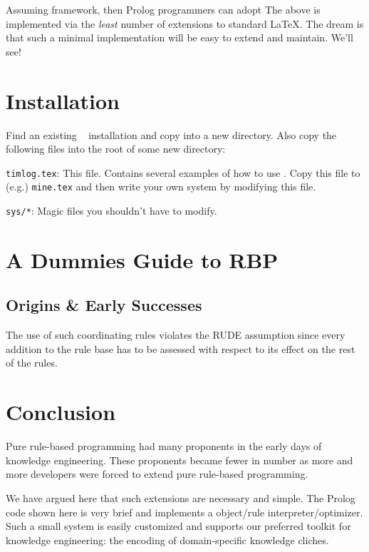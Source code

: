 \documentclass[twocolumn,global]{timlog/svjour}
\begin{document}
Assuming  \TimLoG framework, then Prolog programmers can adopt
The above is implemented via the {\em least} number of extensions to standard
\LaTeX. The dream is that such a minimal implementation will be easy to extend and maintain.
We'll see!

\section{Installation}
Find an existing \TimLoG~ installation and copy into a new directory.
Also copy the  following files into the root of some new directory:
\bd
\item[{\tt timlog.tex}:] This file. Contains several examples of how to use
\TimLoG. Copy this file to (e.g.)  {\tt mine.tex} and then write your own
system by modifying this file.
\item[{\tt sys/*}:] Magic files you shouldn't have to modify.
\ed





\section{A Dummies Guide to RBP}

\subsection{Origins \& Early Successes}


The use of such coordinating rules violates the RUDE assumption since
every addition to the rule base has to be assessed with respect to
its effect on the rest of the rules.


\section{Conclusion}

Pure rule-based programming had many proponents in the early days of
knowledge engineering. These proponents became fewer in number as
more and more developers were forced to extend pure rule-based
programming.

We have argued here that such extensions are necessary and simple.
The Prolog code shown here is very brief and implements a object/rule
interpreter/optimizer. Such a small system is easily customized and
supports our preferred toolkit for knowledge engineering: the
encoding of domain-specific knowledge cliches.
\end{document}
